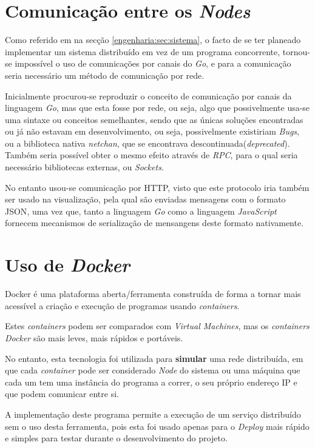 \section{Comunicação entre os \emph{Nodes}}
\label{engenharia:sec:comunicação}
Como referido em na secção \ref{engenharia:sec:sistema}, o facto de se ter planeado implementar um sistema distribuído
em vez de um programa concorrente, tornou-se impossível o uso de comunicações por canais do \emph{Go}, 
e para a comunicação seria necessário um método de comunicação por rede.

Inicialmente procurou-se reproduzir o conceito de comunicação por canais da linguagem \emph{Go}, mas que esta fosse por rede, ou seja, algo que possivelmente
usa-se uma sintaxe ou conceitos semelhantes, sendo que as únicas soluções encontradas ou já não estavam em desenvolvimento, ou seja, possivelmente existiriam \emph{Bugs}, 
ou a biblioteca nativa \emph{netchan}, que se encontrava descontinuada(\emph{deprecated}). 
Também seria possível obter o mesmo efeito através de \emph{RPC}, para o qual seria necessário bibliotecas externas, 
ou \emph{Sockets}.

No entanto usou-se comunicação por \acs*{HTTP}, visto que este protocolo iria também ser usado na visualização,
pela qual são enviadas mensagens com o formato \acs*{JSON}, uma vez que, tanto a linguagem \emph{Go} como a linguagem 
\emph{JavaScript} fornecem mecanismos de serialização de mensangens deste formato nativamente.


\section{Uso de \emph{Docker}}
Docker é uma plataforma aberta/ferramenta construída de forma a tornar mais acessível a criação e execução de programas  usando \emph{containers}.

Estes \emph{containers} podem ser comparados com \emph{Virtual Machines}, mas os \emph{containers} \emph{Docker} são mais leves, mais rápidos e portáveis.

No entanto, esta tecnologia foi utilizada para \textbf{simular} uma rede distribuída,
em que cada \emph{container} pode ser considerado \emph{Node} do sistema ou uma máquina que cada um tem uma instância do programa a correr,
o seu próprio endereço \acs{IP} e que podem comunicar entre si.

A implementação deste programa permite a execução de um serviço distribuído sem o uso desta ferramenta, pois esta foi
usado apenas para o \emph{Deploy} mais rápido e simples para testar durante o desenvolvimento do projeto.


